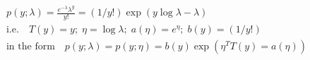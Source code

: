 %
%
\begin{answer}
\begin{align*}
p(y; \lambda) = \frac{e^{-\lambda} \lambda^y}{y!} = (1/y!) \exp(y \log \lambda - \lambda)\\
\text{i.e.} \quad T(y)=y;\; \eta = \log \lambda ;\; a(\eta) = e^\eta ;\; b(y) = (1/y!)\\
\text{in the form} \quad p(y;\lambda) = p(y;\eta) = b(y) \exp(\eta^T T(y) = a(\eta))\\
\end{align*}
\end{answer}
%